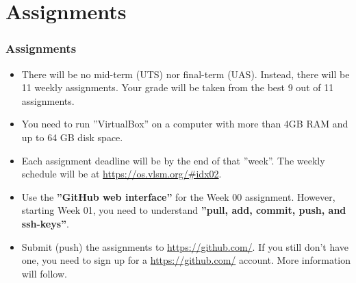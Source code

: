 \documentclass[xcolor=table, notheorems, hyperref={pdfpagelabels=false}]{beamer}
\begin{document}
\section{Assignments}
\begin{frame}[fragile]
\frametitle{Assignments}
\begin{itemize}
\item There will be no mid-term (UTS) nor final-term (UAS). 
      Instead, there will be 11 weekly assignments.
      Your grade will be taken from the best 9 out of 11 assignments.
\item You need to run ''VirtualBox'' on a computer with more than 4GB RAM and up to 64 GB disk space.
\item Each assignment deadline will be by the end of that ''week''. 
      The weekly schedule will be at \url{https://os.vlsm.org/\#idx02}.
\item Use the \textbf{''GitHub web interface''} for the Week 00 assignment.
      However, starting Week 01, you need to understand \textbf{''pull, add, commit, push, and ssh-keys''}.
\item Submit (push) the assignments to \url{https://github.com/}.
      If you still don't have one, you need to sign up for a \url{https://github.com/} account.
      More information will follow.
\end{itemize}
\end{frame}

\end{document}
